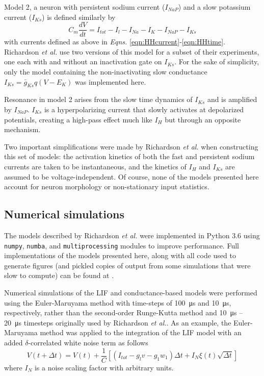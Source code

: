 \documentclass[12pt]{article}
\begin{document}
Model 2, a neuron with persistent sodium current ($I_{NaP}$) and a slow potassium current ($I_{Ks}$) is defined similarly by
\begin{equation}
    C_m \frac{dV}{dt} = I_{tot} - I_{l} - I_{Na} - I_K - I_{NaP} - I_{Ks}
\end{equation}
with currents defined as above in \textit{Eqns.} \ref{eqn:HHcurrent}-\ref{eqn:HHtime}.
Richardson \textit{et al.} use two versions of this model for a subset of their experiments, one each with and without an inactivation gate on $I_{Ks}$.
For the sake of simplicity, only the model containing the non-inactivating slow conductance $I_{Ks} = \bar{g}_{Ks} q (V - E_{K})$ was implemented here.

Resonance in model 2 arises from the slow time dynamics of $I_{Ks}$ and is amplified by $I_{NaP}$.
$I_{Ks}$ is a hyperpolarizing current that slowly activates at depolarized potentials, creating a high-pass effect much like $I_H$ but through an opposite mechanism.

Two important simplifications were made by Richardson \textit{et al.} when constructing this set of models: the activation kinetics of both the fast and persistent sodium currents are taken to be instantaneous, and the kinetics of $I_H$ and $I_{Ks}$ are assumed to be voltage-independent.
Of course, none of the models presented here account for neuron morphology or non-stationary input statistics.


\subsection{Numerical simulations}

The models described by Richardson \textit{et al.} were implemented in Python 3.6 using \texttt{numpy}, \texttt{numba}, and \texttt{multiprocessing} modules to improve performance.
Full implementations of the models presented here, along with all code used to generate figures (and pickled copies of output from some simulations that were slow to compute) can be found at .

Numerical simulations of the LIF and conductance-based models were performed using the Euler-Maruyama method with time-steps of \SI{100}{\us} and \SI{10}{\us}, respectively, rather than the second-order Runge-Kutta method and \SI{10}{\us} -- \SI{20}{\us} timesteps originally used by Richardson \textit{et al.}.
As an example, the Euler-Maruyama method was applied to the integration of the LIF model with an added $\delta$-correlated white noise term as follows
\begin{equation}
    V(t + \Delta t) = V(t) + \frac{1}{C} \left[ (I_{tot} - g_l v - g_1 w_1) \Delta t + I_N \xi (t) \sqrt{\Delta t}\right]
\end{equation}
where $I_N$ is a noise scaling factor with arbitrary units.
\end{document}

